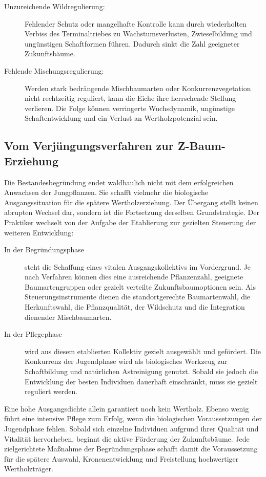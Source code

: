 \documentclass[twocolumn, bibliography=totoc, abstract=true]{scrartcl}
\begin{document}
\begin{description}
\item[Unzureichende Wildregulierung:] Fehlender Schutz oder mangelhafte Kontrolle kann durch wiederholten Verbiss des Terminaltriebes zu Wachstumsverlusten, Zwieselbildung und ungünstigen Schaftformen führen. Dadurch sinkt die Zahl geeigneter Zukunftsbäume.
\item[Fehlende Mischungsregulierung:] Werden stark bedrängende Mischbaumarten oder Konkurrenzvegetation nicht rechtzeitig reguliert, kann die Eiche ihre herrschende Stellung verlieren. Die Folge können verringerte Wuchsdynamik, ungünstige Schaftentwicklung und ein Verlust an Wertholzpotenzial sein.
\end{description}

\subsection{Vom Verjüngungsverfahren zur Z-Baum-Erziehung}

Die Bestandesbegründung endet waldbaulich nicht mit dem erfolgreichen Anwachsen der Jungpflanzen. Sie schafft vielmehr die biologische Ausgangssituation für die spätere Wertholzerziehung. Der Übergang stellt keinen abrupten Wechsel dar, sondern ist die Fortsetzung derselben Grundstrategie. Der Praktiker wechselt von der Aufgabe der Etablierung zur gezielten Steuerung der weiteren Entwicklung:

\begin{description}
\item[In der Begründungsphase] steht die Schaffung eines vitalen Ausgangskollektivs im Vordergrund. Je nach Verfahren können dies eine ausreichende Pflanzenzahl, geeignete Baumartengruppen oder gezielt verteilte Zukunftsbaumoptionen sein. Als Steuerungsinstrumente dienen die standortgerechte Baumartenwahl, die Herkunftswahl, die Pflanzqualität, der Wildschutz und die Integration dienender Mischbaumarten.
\item[In der Pflegephase] wird aus diesem etablierten Kollektiv gezielt ausgewählt und gefördert. Die Konkurrenz der Jugendphase wird als biologisches Werkzeug zur Schaftbildung und natürlichen Astreinigung genutzt. Sobald sie jedoch die Entwicklung der besten Individuen dauerhaft einschränkt, muss sie gezielt reguliert werden.
\end{description}

Eine hohe Ausgangsdichte allein garantiert noch kein Wertholz. Ebenso wenig führt eine intensive Pflege zum Erfolg, wenn die biologischen Voraussetzungen der Jugendphase fehlen. Sobald sich einzelne Individuen aufgrund ihrer Qualität und Vitalität hervorheben, beginnt die aktive Förderung der Zukunftsbäume. Jede zielgerichtete Maßnahme der Begründungsphase schafft damit die Voraussetzung für die spätere Auswahl, Kronenentwicklung und Freistellung hochwertiger Wertholzträger.
\end{document}
